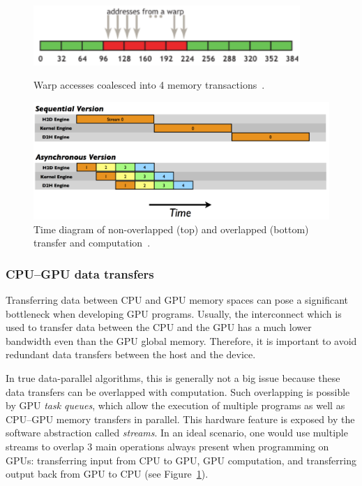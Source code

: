 \begin{figure}[b]
	\centering
	\begin{minipage}{.5\textwidth}
        \centering
        \includegraphics[width=0.9\textwidth]{img/coal1}
        \caption{Warp accesses coalesced into 4 memory transactions~\cite{site:cuda}.}
        \label{fig:coal}
	\end{minipage}%
	\begin{minipage}{.5\textwidth}
        \centering
        \includegraphics[width=\textwidth]{img/C2050Timeline-1024x670.png}
        \caption{Time diagram of non-overlapped (top) and overlapped (bottom) transfer and computation~\cite{site:stream}.}
        \label{fig:transfer}
	\end{minipage}
\end{figure}

\subsubsection{CPU--GPU data transfers}
\label{sec:transfers}

Transferring data between CPU and GPU memory spaces can pose a significant bottleneck when developing GPU programs. Usually, the interconnect which is used to transfer data between the CPU and the GPU has a much lower bandwidth even than the GPU global memory. Therefore, it is important to avoid redundant data transfers between the host and the device.

In true data-parallel algorithms, this is generally not a big issue because these data transfers can be overlapped with computation. Such overlapping is possible by GPU \emph{task queues}, which allow the execution of multiple programs as well as CPU--GPU memory transfers in parallel. This hardware feature is exposed by the software abstraction called \emph{streams}. In an ideal scenario, one would use multiple streams to overlap $3$ main operations always present when programming on GPUs: transferring input from CPU to GPU, GPU computation, and transferring output back from GPU to CPU (see Figure~\ref{fig:transfer}).

